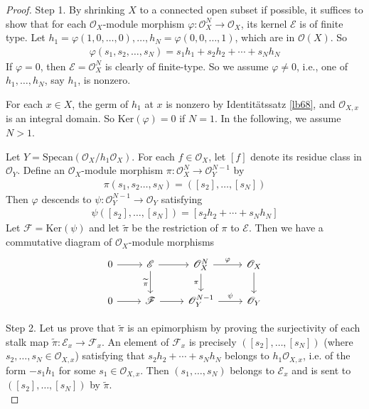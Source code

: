 \documentclass[12pt,b5paper,notitlepage]{report}
\theoremstyle{definition}
\theoremstyle{plain}
\newcommand{\wtd}{\widetilde}
\newcommand{\scr}{\mathscr}
\newcommand{\Ker}{\mathrm{Ker}}
\newcommand{\Specan}{\mathrm{Specan}}
\numberwithin{equation}{section}
\begin{document}
\begin{proof}
Step 1. By shrinking $X$ to a connected open subset if possible, it suffices to show that for each $\scr O_X$-module morphism $\varphi:\scr O_X^N\rightarrow\scr O_X$, its kernel $\scr E$ is of finite type. Let $h_1=\varphi(1,0,\dots,0),\dots,h_N=\varphi(0,0,\dots,1)$, which are in $\scr O(X)$. So
\begin{align*}
\varphi(s_1,s_2,\dots,s_N)=s_1h_1+s_2h_2+\cdots+s_Nh_N
\end{align*}
If $\varphi=0$, then $\scr E=\scr O_X^N$ is clearly of finite-type. So we assume $\varphi\neq 0$, i.e., one of $h_1,\dots,h_N$, say $h_1$, is nonzero. 

For each $x\in X$, the germ of $h_1$ at $x$ is nonzero by Identit\"atssatz \ref{lb68}, and $\scr O_{X,x}$ is an integral domain. So $\Ker(\varphi)=0$ if $N=1$. In the following, we assume $N>1$. 

Let $Y=\Specan(\scr O_X/h_1\scr O_X)$. For each $f\in\scr O_X$, let $[f]$ denote its residue class in $\scr O_Y$. Define an $\scr O_X$-module morphism $\pi:\scr O_X^N\rightarrow\scr O_Y^{N-1}$ by
\begin{align*}
\pi(s_1,s_2\dots,s_N)=([s_2],\dots,[s_N])
\end{align*} 
Then $\varphi$ descends to $\psi:\scr O_Y^{N-1}\rightarrow\scr O_Y$ satisfying
\begin{align*}
\psi([s_2],\dots,[s_N])=[s_2h_2+\cdots+s_Nh_N]
\end{align*}
Let $\scr F=\Ker(\psi)$ and let $\wtd\pi$ be the restriction of $\pi$ to $\scr E$. Then we have a commutative diagram of $\scr O_X$-module morphisms
\begin{equation*}
\begin{tikzcd}
0 \arrow[r] & \scr E \arrow[d, "\wtd\pi"'] \arrow[r] & \scr O_X^N \arrow[r, "\varphi"] \arrow[d, "\pi"'] & \scr O_X \arrow[d] \\
0 \arrow[r] & \scr F \arrow[r]                   & \scr O_Y^{N-1} \arrow[r, "\psi"]                      & \scr O_Y          
\end{tikzcd}
\end{equation*}


Step 2. Let us prove that $\wtd\pi$ is an epimorphism by proving the surjectivity of each stalk map $\wtd\pi:\scr E_x\rightarrow\scr F_x$. An element of $\scr F_x$ is precisely $([s_2],\dots,[s_N])$ (where $s_2,\dots,s_N\in\scr O_{X,x}$) satisfying that $s_2h_2+\cdots+s_Nh_N$ belongs to $h_1\scr O_{X,x}$, i.e. of the form $-s_1h_1$ for some $s_1\in\scr O_{X,x}$. Then $(s_1,\dots,s_N)$ belongs to $\scr E_x$ and is sent to $([s_2],\dots,[s_N])$ by $\wtd\pi$.\\[-1ex]


\end{proof}
\end{document}
